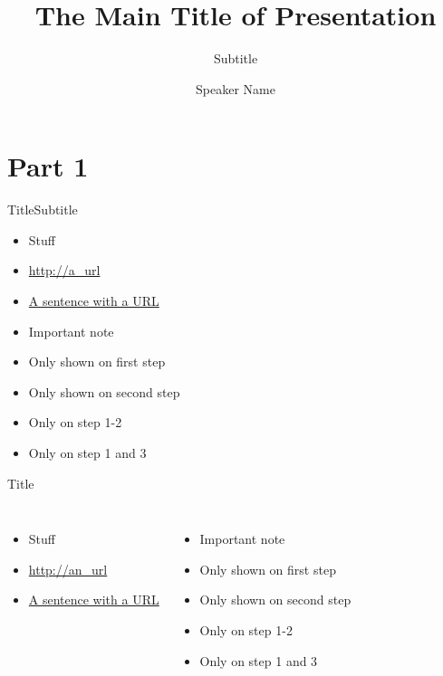 \documentclass{dcpresentation}
\title{The Main Title of Presentation}
\subtitle{Subtitle}
\author{Speaker Name}
\institute{SciLifeLab Data Centre}
\date{}
\begin{document}
 \begin{frame}
  \maketitle
 \end{frame}
 

\section{Part 1}
 
\begin{frame}{Title}{Subtitle}
 \begin{itemize}
  \item Stuff
  \item \url{http://a_url}
  \item \href{http://}{A sentence with a URL}
  \item \alert{Important note}
  \item<1> Only shown on first step
  \item<2> Only shown on second step
  \item<1-2> Only on step 1-2
  \item<1,3> Only on step 1 and 3
 \end{itemize}
\end{frame}

\begin{frame}{Title}
 \begin{columns}
 \begin{itemize}
  \item Stuff
  \item \url{http://an_url}
  \item \href{http://}{A sentence with a URL}
 \end{itemize}
 \begin{itemize}
  \item \alert{Important note}
  \item<1> Only shown on first step
  \item<2> Only shown on second step
  \item<1-2> Only on step 1-2
  \item<1,3> Only on step 1 and 3
 \end{itemize}
\end{columns}
\end{frame}
\end{document}
